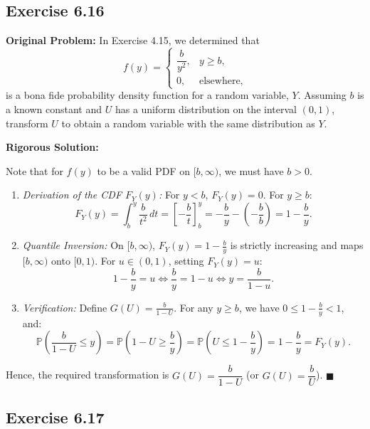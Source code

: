 \documentclass[11pt, letterpaper]{article}
\theoremstyle{definition}
\theoremstyle{remark}
\newcommand{\Prob}{\mathbb{P}}
\begin{document}
\subsection{Exercise 6.16}

\textbf{Original Problem:}
In Exercise 4.15, we determined that
\[
    f(y) = \begin{cases} \dfrac{b}{y^2}, & y \ge b, \\[6pt] 0, & \text{elsewhere,} \end{cases}
\]
is a bona fide probability density function for a random variable, $Y$. Assuming $b$ is a known constant and $U$ has a uniform distribution on the interval $(0, 1)$, transform $U$ to obtain a random variable with the same distribution as $Y$.

\hrulefill

\textbf{Rigorous Solution:}

Note that for $f(y)$ to be a valid PDF on $[b, \infty)$, we must have $b > 0$.
\begin{enumerate}
    \item \textit{Derivation of the CDF $F_Y(y)$:} For $y < b$, $F_Y(y) = 0$. For $y \ge b$:
    \[
        F_Y(y) = \int_{b}^{y} \frac{b}{t^2}\,dt = \left[ -\frac{b}{t} \right]_{b}^{y} = -\frac{b}{y} - \left(-\frac{b}{b}\right) = 1 - \frac{b}{y}.
    \]
    \item \textit{Quantile Inversion:} On $[b, \infty)$, $F_Y(y) = 1 - \frac{b}{y}$ is strictly increasing and maps $[b, \infty)$ onto $[0, 1)$. For $u \in (0, 1)$, setting $F_Y(y) = u$:
    \[
        1 - \frac{b}{y} = u \iff \frac{b}{y} = 1 - u \iff y = \frac{b}{1 - u}.
    \]
    \item \textit{Verification:} Define $G(U) = \frac{b}{1 - U}$. For any $y \ge b$, we have $0 \le 1 - \frac{b}{y} < 1$, and:
    \[
        \Prob\left(\frac{b}{1 - U} \le y\right) = \Prob\left(1 - U \ge \frac{b}{y}\right) = \Prob\left(U \le 1 - \frac{b}{y}\right) = 1 - \frac{b}{y} = F_Y(y).
    \]
\end{enumerate}
Hence, the required transformation is $G(U) = \dfrac{b}{1 - U}$ (or $G(U) = \dfrac{b}{U}$). \hfill $\blacksquare$

\subsection{Exercise 6.17}
\end{document}
